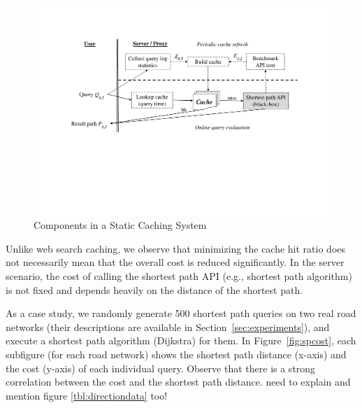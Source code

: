 \documentclass{sig-alternate}
\begin{document}
\begin{figure}[hbt]
  \center
        \includegraphics[width=1.0\columnwidth]{figures/routequery}
        \caption{Components in a Static Caching System}
  \label{fig:routequery}
\end{figure}










Unlike web search caching, we observe that
minimizing the cache hit ratio does not necessarily mean that the overall cost is reduced significantly.
In the server scenario, the cost of calling the shortest path API (e.g., shortest path algorithm) is not fixed
and depends heavily on the distance of the shortest path.


As a case study, we randomly generate 500 shortest path queries on two real road networks
(their descriptions are available in Section~\ref{sec:experiments}),
and execute a shortest path algorithm (Dijkstra) for them.
In Figure~\ref{fig:spcost}, each subfigure (for each road network) shows the shortest path distance (x-axis)
and the cost (y-axis) of each individual query.
Observe that there is a strong correlation between the cost and the shortest path distance.
{\color{blue} need to explain and mention figure \ref{tbl:directiondata} too!}
\end{document}

